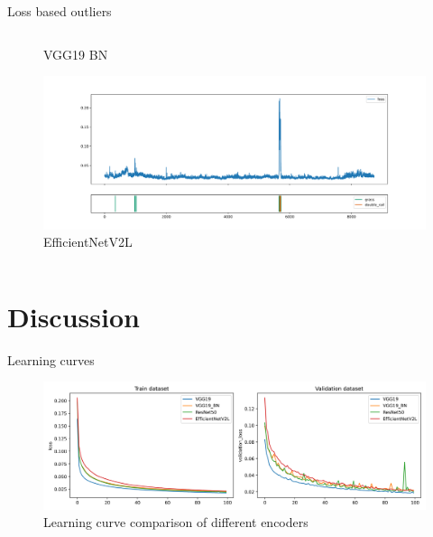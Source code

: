 \documentclass[aspectratio=169]{beamer}
\begin{document}
\begin{frame}{Loss based outliers}
\begin{columns}
\begin{column}{0.45\textwidth}
\begin{figure}
                \caption*{VGG19 BN}
                \includegraphics[width=\columnwidth,trim={0 0 0 1cm},clip]{./results/efficientnetv2l_vgg19/20230525_194238_feature_vectors_loss.png}
                \caption*{EfficientNetV2L}
            \end{figure}
        \end{column}
    \end{columns}
\end{frame}

\section{Discussion}
\begin{frame}{Learning curves}
    \begin{figure}
        \centering
        \includegraphics[width=\textwidth]{./results/comparison/learning_curves.png}
        \caption*{Learning curve comparison of different encoders}
    \end{figure}
\end{frame}
\end{document}
